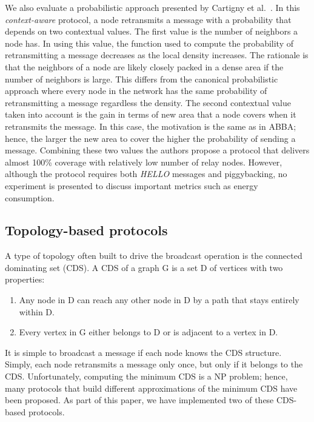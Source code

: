 We also evaluate a probabilistic approach presented by Cartigny et al.~\cite{Cartigny:2003:BNR:2727141.2727459}.
In this \textit{context-aware} protocol, a node retransmits a message with a probability that depends on two contextual values.
The first value is the number of neighbors a node has.
In using this value, the function used to compute the probability of retransmitting a message decreases as the local density increases.
The rationale is that the neighbors of a node are likely closely packed in a dense area if the number of neighbors is large.
This differs from the canonical probabilistic approach where every node in the network has the same probability of retransmitting a message regardless the density.
The second contextual value taken into account is the gain in terms of new area that a node covers when it retransmits the message.
In this case, the motivation is the same as in ABBA; hence, the larger the new area to cover the higher the probability of sending a message. 
Combining these two values the authors propose a protocol that delivers almost 100\% coverage with relatively low number of relay nodes.
However, although the protocol requires both \textit{HELLO} messages and piggybacking, no experiment is presented to discuss important metrics such as energy consumption. 


\subsection*{Topology-based protocols}

A type of topology often built to drive the broadcast operation is the connected dominating set (CDS).
A CDS of a graph G is a set D of vertices with two properties:

\begin{enumerate}
	\item Any node in D can reach any other node in D by a path that stays entirely within D.
	\item Every vertex in G either belongs to D or is adjacent to a vertex in D.
\end{enumerate}

It is simple to broadcast a message if each node knows the CDS structure.
Simply, each node retransmits a message only once, but only if it belongs to the CDS.
Unfortunately, computing the minimum CDS is a NP problem; hence, many protocols that build different approximations of the minimum CDS have been proposed.
As part of this paper, we have implemented two of these CDS-based protocols.


